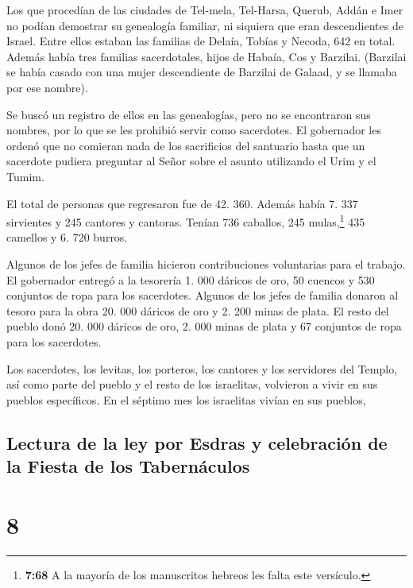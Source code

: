  Los que procedían de las ciudades de Tel-mela,
Tel-Harsa, Querub, Addán e Imer no podían demostrar su genealogía
familiar, ni siquiera que eran descendientes de Israel. 
Entre ellos estaban las familias de Delaía, Tobías y Necoda, 642 en
total.  Además había tres familias sacerdotales, hijos de
Habaía, Cos y Barzilai. (Barzilai se había casado con una mujer
descendiente de Barzilai de Galaad, y se llamaba por ese nombre).

 Se buscó un registro de ellos en las genealogías, pero
no se encontraron sus nombres, por lo que se les prohibió servir como
sacerdotes.  El gobernador les ordenó que no comieran
nada de los sacrificios del santuario hasta que un sacerdote pudiera
preguntar al Señor sobre el asunto utilizando el Urim y el Tumim.

 El total de personas que regresaron fue de 42. 360.
 Además había 7. 337 sirvientes y 245 cantores y
cantoras.  Tenían 736 caballos, 245 mulas,\footnote{\textbf{7:68}
  A la mayoría de los manuscritos hebreos les falta este versículo.}
 435 camellos y 6. 720 burros.

 Algunos de los jefes de familia hicieron contribuciones
voluntarias para el trabajo. El gobernador entregó a la tesorería 1. 000
dáricos de oro, 50 cuencos y 530 conjuntos de ropa para los sacerdotes.
 Algunos de los jefes de familia donaron al tesoro para
la obra 20. 000 dáricos de oro y 2. 200 minas de plata. 
El resto del pueblo donó 20. 000 dáricos de oro, 2. 000 minas de plata y
67 conjuntos de ropa para los sacerdotes.

 Los sacerdotes, los levitas, los porteros, los cantores
y los servidores del Templo, así como parte del pueblo y el resto de los
israelitas, volvieron a vivir en sus pueblos específicos. En el séptimo
mes los israelitas vivían en sus pueblos,

\hypertarget{lectura-de-la-ley-por-esdras-y-celebraciuxf3n-de-la-fiesta-de-los-tabernuxe1culos}{%
\subsection{Lectura de la ley por Esdras y celebración de la Fiesta de
los
Tabernáculos}\label{lectura-de-la-ley-por-esdras-y-celebraciuxf3n-de-la-fiesta-de-los-tabernuxe1culos}}

\hypertarget{section-7}{%
\section{8}\label{section-7}}

